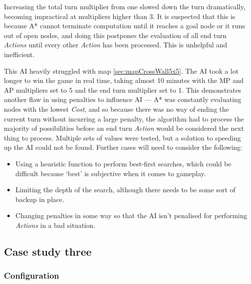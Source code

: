 \documentclass[11pt, a4paper]{report}
\begin{document}
Increasing the total turn multiplier from one slowed down the turn dramatically, becoming impractical at multipliers higher than 3. It is suspected that this is because A* cannot terminate computation until it reaches a goal node or it runs out of open nodes, and doing this postpones the evaluation of all end turn \emph{Actions} until every other \emph{Action} has been processed. This is unhelpful and inefficient.

This AI heavily struggled with map \ref{sec:mapCrossWall5x5}. The AI took a lot longer to win the game in real time, taking almost 10 minutes with the MP and AP multipliers set to 5 and the end turn multiplier set to 1. This demonstrates another flaw in using penalties to influence AI --- A* was constantly evaluating nodes with the lowest \emph{Cost}, and so because there was no way of ending the current turn without incurring a large penalty, the algorithm had to process the majority of possibilities before an end turn \emph{Action} would be considered the next thing to process. Multiple sets of values were tested, but a solution to speeding up the AI could not be found. Further cases will need to consider the following: 

\begin{itemize}
  \item Using a heuristic function to perform best-first searches, which could be difficult because `best' is subjective when it comes to gameplay.
  \item Limiting the depth of the search, although there needs to be some sort of backup in place.
  \item Changing penalties in some way so that the AI isn't penalised for performing \emph{Actions} in a bad situation.
\end{itemize}

\subsection{Case study three}
\label{subsec:caseStudyThree}

\subsubsection{Configuration}
\end{document}
